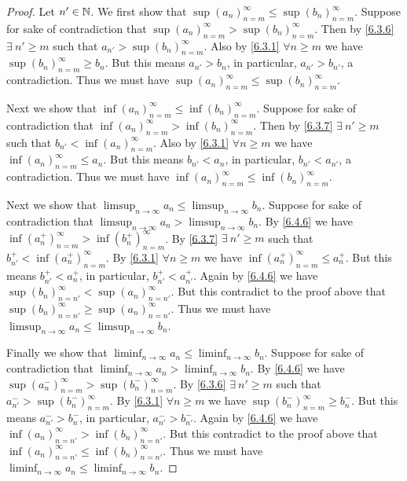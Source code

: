 \begin{proof}
  Let \(n' \in \mathbb{N}\).
  We first show that \(\sup(a_n)_{n = m}^\infty \leq \sup(b_n)_{n = m}^\infty\).
  Suppose for sake of contradiction that \(\sup(a_n)_{n = m}^\infty > \sup(b_n)_{n = m}^\infty\).
  Then by \cref{6.3.6} \(\exists\ n' \geq m\) such that \(a_{n'} > \sup(b_n)_{n = m}^\infty\).
  Also by \cref{6.3.1} \(\forall n \geq m\) we have \(\sup(b_n)_{n = m}^\infty \geq b_n\).
  But this means \(a_{n'} > b_n\), in particular, \(a_{n'} > b_{n'}\), a contradiction.
  Thus we must have \(\sup(a_n)_{n = m}^\infty \leq \sup(b_n)_{n = m}^\infty\).

  Next we show that \(\inf(a_n)_{n = m}^\infty \leq \inf(b_n)_{n = m}^\infty\).
  Suppose for sake of contradiction that \(\inf(a_n)_{n = m}^\infty > \inf(b_n)_{n = m}^\infty\).
  Then by \cref{6.3.7} \(\exists\ n' \geq m\) such that \(b_{n'} < \inf(a_n)_{n = m}^\infty\).
  Also by \cref{6.3.1} \(\forall n \geq m\) we have \(\inf(a_n)_{n = m}^\infty \leq a_n\).
  But this means \(b_{n'} < a_n\), in particular, \(b_{n'} < a_{n'}\), a contradiction.
  Thus we must have \(\inf(a_n)_{n = m}^\infty \leq \inf(b_n)_{n = m}^\infty\).

  Next we show that \(\limsup_{n \to \infty} a_n \leq \limsup_{n \to \infty} b_n\).
  Suppose for sake of contradiction that \(\limsup_{n \to \infty} a_n > \limsup_{n \to \infty} b_n\).
  By \cref{6.4.6} we have \(\inf(a_n^+)_{n = m}^\infty > \inf(b_n^+)_{n = m}^\infty\).
  By \cref{6.3.7} \(\exists\ n' \geq m\) such that \(b_{n'}^+ < \inf(a_n^+)_{n = m}^\infty\).
  By \cref{6.3.1} \(\forall n \geq m\) we have \(\inf(a_n^+)_{n = m}^\infty \leq a_n^+\).
  But this means \(b_{n'}^+ < a_n^+\), in particular, \(b_{n'}^+ < a_{n'}^+\).
  Again by \cref{6.4.6} we have \(\sup(b_n)_{n = n'}^\infty < \sup(a_n)_{n = n'}^\infty\).
  But this contradict to the proof above that \(\sup(b_n)_{n = n'}^\infty \geq \sup(a_n)_{n = n'}^\infty\).
  Thus we must have \(\limsup_{n \to \infty} a_n \leq \limsup_{n \to \infty} b_n\).

  Finally we show that \(\liminf_{n \to \infty} a_n \leq \liminf_{n \to \infty} b_n\).
  Suppose for sake of contradiction that \(\liminf_{n \to \infty} a_n > \liminf_{n \to \infty} b_n\).
  By \cref{6.4.6} we have \(\sup(a_n^-)_{n = m}^\infty > \sup(b_n^-)_{n = m}^\infty\).
  By \cref{6.3.6} \(\exists\ n' \geq m\) such that \(a_{n'}^- > \sup(b_n^-)_{n = m}^\infty\).
  By \cref{6.3.1} \(\forall n \geq m\) we have \(\sup(b_n^-)_{n = m}^\infty \geq b_n^-\).
  But this means \(a_{n'}^- > b_n^-\), in particular, \(a_{n'}^- > b_{n'}^-\).
  Again by \cref{6.4.6} we have \(\inf(a_n)_{n = n'}^\infty > \inf(b_n)_{n = n'}^\infty\).
  But this contradict to the proof above that \(\inf(a_n)_{n = n'}^\infty \leq \inf(b_n)_{n = n'}^\infty\).
  Thus we must have \(\liminf_{n \to \infty} a_n \leq \liminf_{n \to \infty} b_n\).
\end{proof}

